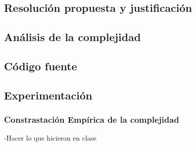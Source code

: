 \documentclass[a4paper]{article}
\begin{document}
\newpage
\subsection{Resoluci\'on propuesta y justificaci\'on}

\newpage
\subsection{An\'alisis de la complejidad}
\newpage
\subsection{C\'odigo fuente}
\newpage
\subsection{Experimentaci\'on}


\subsubsection{Constrastaci\'on Emp\'irica de la complejidad}
-Hacer lo que hicieron en clase\\
\newpage












\end{document}
